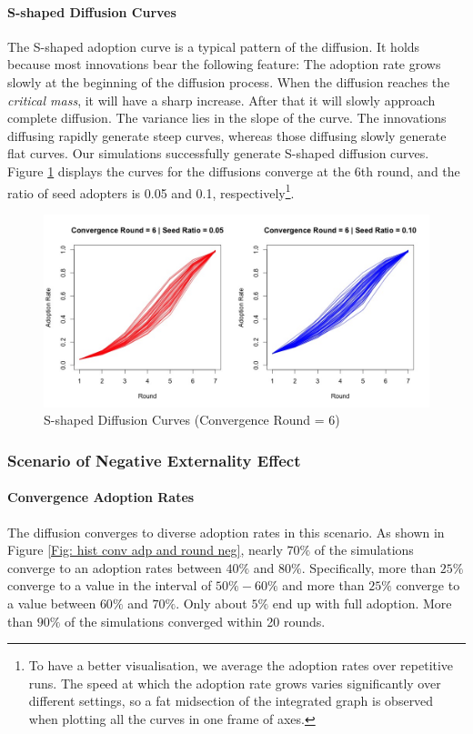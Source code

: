 \documentclass{bmcart}
\renewcommand{\figurename}{Figure }
\begin{document}
\paragraph{S-shaped Diffusion Curves}
The S-shaped adoption curve is a typical pattern of the diffusion. It holds because most innovations bear the following feature: The adoption rate grows slowly at the beginning of the diffusion process. When the diffusion reaches the \emph{critical mass}, it will have a sharp increase. After that it will slowly approach complete diffusion. The variance lies in the slope of the curve. The innovations diffusing rapidly generate steep curves, whereas those diffusing slowly generate flat curves. Our simulations successfully generate S-shaped diffusion curves. \figurename \ref{Fig: s-shaped curves round=6} displays the curves for the diffusions converge at the 6th round, and the ratio of seed adopters is 0.05 and 0.1, respectively\footnote{To have a better visualisation, we average the adoption rates over repetitive runs. The speed at which the adoption rate grows varies significantly over different settings, so a fat midsection of the integrated graph is observed when plotting all the curves in one frame of axes.}.

\begin{center}
\begin{figure}[ht!]
\centering
\includegraphics[scale=0.35]{S-shape_curves_round_6_pos.jpg}
\caption{S-shaped Diffusion Curves (Convergence Round = 6)}
\label{Fig: s-shaped curves round=6}
\end{figure}
\end{center}

\subsubsection*{Scenario of Negative Externality Effect}
\paragraph{Convergence Adoption Rates}
The diffusion converges to diverse adoption rates in this scenario. As shown in \figurename \ref{Fig: hist conv adp and round neg}, nearly $70\%$ of the simulations converge to an adoption rates between $40\%$ and $80\%$. Specifically, more than $25\%$ converge to a value in the interval of $50\%-60\%$ and more than $25\%$ converge to a value between $60\%$ and $70\%$. Only about $5\%$ end up with full adoption. More than $90\%$ of the simulations converged within 20 rounds.
\end{document}
